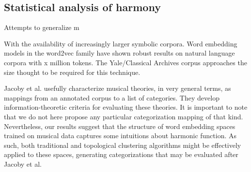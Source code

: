 \subsection{Statistical analysis of harmony}

Attempts to generalize m

With the availability of increasingly larger symbolic corpora. Word embedding models in the word2vec family have shown robust results on natural language corpora with x million tokens. The Yale/Classical Archives corpus approaches the size thought to be required for this technique.

Jacoby et al. usefully characterize musical theories, in very general terms, as mappings from an annotated corpus to a list of categories. They develop information-theoretic criteria for evaluating these theories. It is important to note that we do not here propose any particular categorization mapping of that kind. Nevertheless, our results suggest that the structure of word embedding spaces trained on musical data captures some intuitions about harmonic function. As such, both traditional and topological clustering algorithms might be effectively applied to these spaces, generating categorizations that may be evaluated after Jacoby et al.

